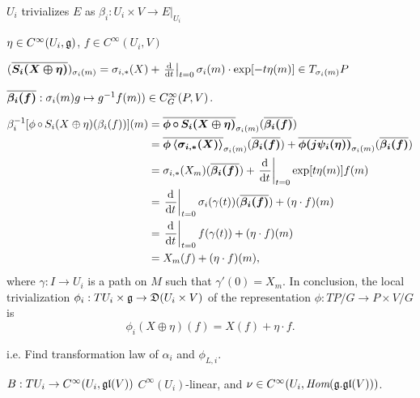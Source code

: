 \begin{example}[Local trivialization of representation of $TP/G$ on $E = P \times V/G$]\label{localTrivializationOfRepresentationOfAtiyahTPGonAssociated}
$U_i$ trivializes $E$ as $\beta_i: U_i \times V\to E|_{U_i}$

$\eta \in C^\infty(U_i, \mathfrak{g})$, $f \in C^\infty(U_i, V)$

$(\upsect{S_i(X \oplus \eta)})_{\sigma_i(m)} = \sigma_{i, *}(X) + \der{t}[t=0]{\sigma_i(m) \cdot \exp[-t \eta(m)]} \in T_{\sigma_i(m)} P$


$\overline{\bm{\beta_i(f)}}: \sigma_i(m)g \mapsto g^{-1} f(m)) \in C^\infty_G(P, V)$.


\begin{align*}
    \beta_i^{-1}[\phi\comp S_i(X \oplus \eta)(\beta_i(f))] (m)
        &= \upsect{\phi \comp S_i(X \oplus \eta)}_{\sigma_i(m)} (\upsect{\beta_i(f)})\\
        &= \upsect{\phi\cl{\sigma_{i, *}(X)}}_{\sigma_i(m)} (\upsect{\beta_i(f)}) + \upsect{\phi( j\psi_i(\eta))}_{\sigma_i(m)} (\upsect{\beta_i(f)})\\
        &= \sigma_{i, *}(X_m)(\upsect{\beta_i(f)}) + \der{t}[t=0]{\exp[t \eta(m)] f(m)}\\
        &= \der{t}[t = 0]{\sigma_i(\gamma(t))} (\upsect{\beta_i(f)}) + (\eta \cdot f)(m)\\
        &= \der{t}[t=0]{f(\gamma(t))} + (\eta \cdot f)(m)\\
        &= X_m(f) + (\eta \cdot f)(m),
\end{align*}
where $\gamma: I \to U_i$ is a path on $M$ such that $\gamma'(0) = X_m$. In conclusion, the local trivialization $\phi_i: TU_i \times \alg g \to \alg D(U_i \times V)$ of the representation $\phi: TP/G \to P \times V/G$ is
\begin{equation}\label{equationLocalRepresentationAtiyahLieAlgebroidOnAssociatedVectorBundleExpectedTrivialALgebroidRepresentationActionOfGroup}
    \phi_i(X \oplus \eta)(f) = X(f) + \eta \cdot f.
\end{equation}
\end{example}


\begin{example}
i.e. Find transformation law of $\alpha_i$ and $\phi_{L, i}$.
\end{example}


\begin{example}
$B: TU_i \to C^\infty(U_i, \mathfrak{gl}(V))$ $C^\infty(U_i)$-linear, and $\nu \in C^\infty(U_i, \operatorname{\textit{Hom}}(\mathfrak{g}. \mathfrak{gl}(V)))$.
\end{example}


